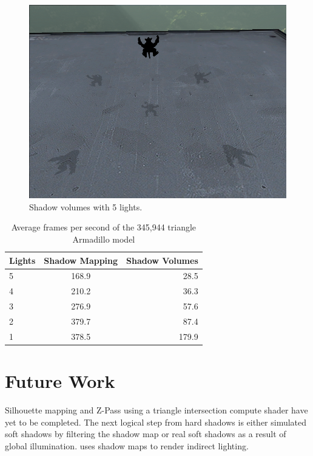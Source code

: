 \documentclass[12pt]{article}
\begin{document}
\begin{figure}
\centering
\includegraphics[scale=0.5]{ArmadilloVolumes.png}
\caption{\label{fig:volumes} Shadow volumes with 5 lights.}
\end{figure}

\begin{table}
\centering
\begin{tabular}{|l|c|r|}
\hline
Lights & Shadow Mapping & Shadow Volumes \\\hline
5 & 168.9 & 28.5 \\
4 & 210.2 & 36.3 \\
3 & 276.9 & 57.6 \\
2 & 379.7 & 87.4 \\
1 & 378.5 & 179.9 \\
\hline
\end{tabular}
\caption{\label{tab:widgets} Average frames per second of the 345,944 triangle Armadillo model}
\end{table}

\section{Future Work}

Silhouette mapping and Z-Pass using a triangle intersection compute shader have yet to be completed. The next logical step from hard shadows is either simulated soft shadows by filtering the shadow map or real soft shadows as a result of global illumination.
\cite{Dachsbacher:2005:RSM:1053427.1053460} uses shadow maps to render indirect lighting.



\end{document}
